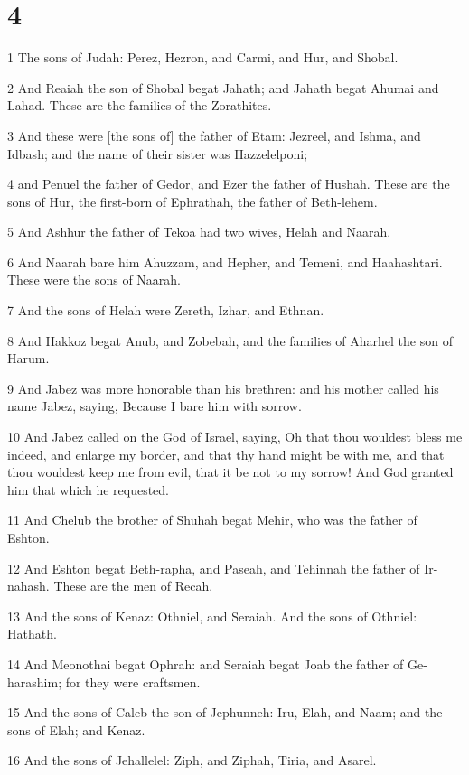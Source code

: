 \chapter{4}

\par 1 The sons of Judah: Perez, Hezron, and Carmi, and Hur, and Shobal.
\par 2 And Reaiah the son of Shobal begat Jahath; and Jahath begat Ahumai and Lahad. These are the families of the Zorathites.
\par 3 And these were [the sons of] the father of Etam: Jezreel, and Ishma, and Idbash; and the name of their sister was Hazzelelponi;
\par 4 and Penuel the father of Gedor, and Ezer the father of Hushah. These are the sons of Hur, the first-born of Ephrathah, the father of Beth-lehem.
\par 5 And Ashhur the father of Tekoa had two wives, Helah and Naarah.
\par 6 And Naarah bare him Ahuzzam, and Hepher, and Temeni, and Haahashtari. These were the sons of Naarah.
\par 7 And the sons of Helah were Zereth, Izhar, and Ethnan.
\par 8 And Hakkoz begat Anub, and Zobebah, and the families of Aharhel the son of Harum.
\par 9 And Jabez was more honorable than his brethren: and his mother called his name Jabez, saying, Because I bare him with sorrow.
\par 10 And Jabez called on the God of Israel, saying, Oh that thou wouldest bless me indeed, and enlarge my border, and that thy hand might be with me, and that thou wouldest keep me from evil, that it be not to my sorrow! And God granted him that which he requested.
\par 11 And Chelub the brother of Shuhah begat Mehir, who was the father of Eshton.
\par 12 And Eshton begat Beth-rapha, and Paseah, and Tehinnah the father of Ir-nahash. These are the men of Recah.
\par 13 And the sons of Kenaz: Othniel, and Seraiah. And the sons of Othniel: Hathath.
\par 14 And Meonothai begat Ophrah: and Seraiah begat Joab the father of Ge-harashim; for they were craftsmen.
\par 15 And the sons of Caleb the son of Jephunneh: Iru, Elah, and Naam; and the sons of Elah; and Kenaz.
\par 16 And the sons of Jehallelel: Ziph, and Ziphah, Tiria, and Asarel.

